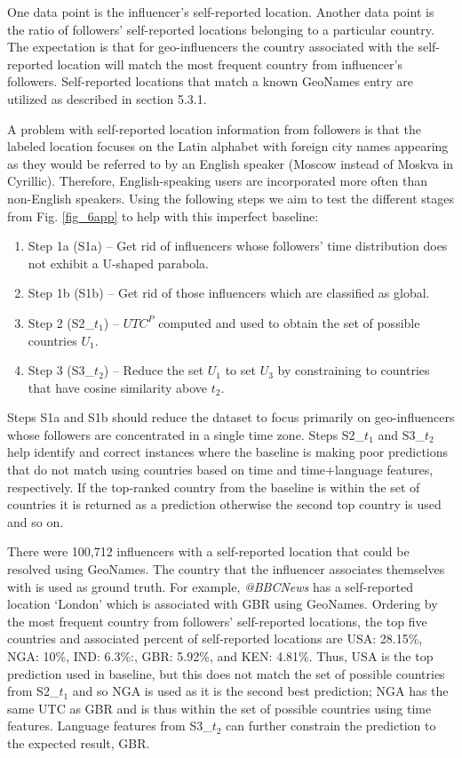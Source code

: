 One data point is the influencer's self-reported location. Another data point is the ratio of followers' self-reported locations belonging to a particular country. The expectation is that for geo-influencers the country associated with the self-reported location will match the most frequent country from influencer's followers. Self-reported locations that match a known GeoNames entry are utilized as described in section 5.3.1.

A problem with self-reported location information from followers is that the labeled location focuses on the Latin alphabet with foreign city names appearing as they would be referred to by an English speaker (Moscow instead of Moskva in Cyrillic). Therefore, English-speaking users are incorporated more often than non-English speakers. Using the following steps we aim to test the different stages from Fig. \ref{fig_6app} to help with this imperfect baseline:

\begin{enumerate}
\item Step 1a (S1a) -- Get rid of influencers whose followers' time distribution does not exhibit a U-shaped parabola.
\item Step 1b (S1b) --  Get rid of those influencers which are classified as global.
\item Step 2 (S2\_$t_1$) -- $UTC^P$ computed and used to obtain the set of possible countries $U_1$.
\item Step 3 (S3\_$t_2$) -- Reduce  the set $U_1$ to set $U_3$ by constraining to countries that have cosine similarity above $t_2$.
\end{enumerate}

Steps S1a and S1b should reduce the dataset to focus primarily on geo-influencers whose followers are concentrated in a single time zone. Steps S2\_$t_1$ and S3\_$t_2$ help identify and correct instances where the baseline is making poor predictions that do not match using countries based on time and time+language features, respectively. If the top-ranked country from the baseline is within the set of countries it is returned as a prediction otherwise the second top country is used and so on. 

There were 100,712 influencers with a self-reported location that could be resolved using GeoNames. The country that the influencer associates themselves with is used as ground truth. For example, \emph{@BBCNews} has a self-reported location `London' which is associated with GBR using GeoNames. 
Ordering by the most frequent country from followers' self-reported locations, the top five countries and associated percent of self-reported locations are USA: 28.15\%, NGA: 10\%, IND: 6.3\%:, GBR: 5.92\%, and KEN: 4.81\%. Thus, USA is the top prediction used in baseline, but this does not match the set of possible countries from S2\_$t_1$ and so NGA is used as it is the second best prediction; NGA has the same UTC as GBR and is thus within the set of possible countries using time features. Language features from S3\_$t_2$ can further constrain the prediction to the expected result, GBR.

